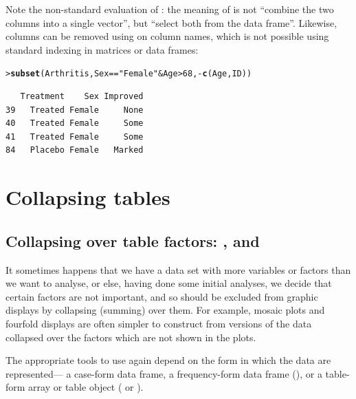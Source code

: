 \documentclass[10pt,krantz2]{krantz}\usepackage[]{graphicx}\usepackage[]{color}
\makeatletter
\newcommand{\hlnum}[1]{\textcolor[rgb]{0.686,0.059,0.569}{#1}}%
\newcommand{\hlstr}[1]{\textcolor[rgb]{0.192,0.494,0.8}{#1}}%
\newcommand{\hlopt}[1]{\textcolor[rgb]{0,0,0}{#1}}%
\newcommand{\hlstd}[1]{\textcolor[rgb]{0.345,0.345,0.345}{#1}}%
\newcommand{\hlkwd}[1]{\textcolor[rgb]{0.737,0.353,0.396}{\textbf{#1}}}%
\newenvironment{kframe}{%
 \def\at@end@of@kframe{}%
 \ifinner\ifhmode%
  \def\at@end@of@kframe{\end{minipage}}%
  \begin{minipage}{\columnwidth}%
 \fi\fi%
 \def\FrameCommand##1{\hskip\@totalleftmargin \hskip-\fboxsep
 \colorbox{shadecolor}{##1}\hskip-\fboxsep
     \hskip-\linewidth \hskip-\@totalleftmargin \hskip\columnwidth}%
 \MakeFramed {\advance\hsize-\width
   \@totalleftmargin\z@ \linewidth\hsize
   \@setminipage}}%
 {\par\unskip\endMakeFramed%
 \at@end@of@kframe}
\newenvironment{knitrout}{}{} %
\renewenvironment{knitrout}{\small\renewcommand{\baselinestretch}{.85}}{} %
\makeatother
\begin{document}
\noindent Note the non-standard evaluation of : the meaning of  is not ``combine the two columns into a single
vector'', but ``select both from the data frame''. Likewise, columns
can be removed using \code{-} on column names, which is not possible
using standard indexing in matrices or data frames:

\begin{knitrout}
\color{fgcolor}\begin{kframe}
\begin{alltt}
\hlstd{> }\hlkwd{subset}\hlstd{(Arthritis, Sex} \hlopt{==} \hlstr{"Female"} \hlopt{&} \hlstd{Age} \hlopt{>} \hlnum{68}\hlstd{,} \hlopt{-}\hlkwd{c}\hlstd{(Age, ID))}
\end{alltt}
\begin{verbatim}
   Treatment    Sex Improved
39   Treated Female     None
40   Treated Female     Some
41   Treated Female     Some
84   Placebo Female   Marked
\end{verbatim}
\end{kframe}
\end{knitrout}

\section[Collapsing tables]{Collapsing tables}\label{sec:collapsetables}

\subsection[Collapsing over table factors]{Collapsing over table factors: ,  and }\label{sec:collapse}

It sometimes happens that we have a data set with more variables or factors than
we want to analyse, or else, having done some initial analyses, we decide that
certain factors are not important, and so should be excluded from graphic displays
by collapsing (summing) over them.  For example, mosaic plots and fourfold displays
are often simpler to construct from versions of the data collapsed over
the factors which are not shown in the plots.

The appropriate tools to use again depend on
the form in which the data are represented--- a case-form data frame, a
frequency-form data frame (), or a table-form array or
table object ( or ).
\end{document}
